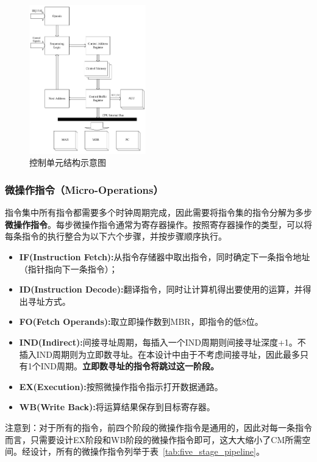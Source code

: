 \documentclass[lang=cn,a4paper,newtx]{elegantpaper}
\begin{document}
\begin{figure}[htbp]
  \centering
  \includegraphics[width = 0.45\textwidth]{figure/CU.pdf}
  \caption{控制单元结构示意图}
  \label{fig:controlunit}
\end{figure}

\subsubsection{微操作指令（Micro-Operations）}\label{sec:cu:micro}
指令集中所有指令都需要多个时钟周期完成，因此需要将指令集的指令分解为多步\textbf{微操作指令}。每步微操作指令通常为寄存器操作。按照寄存器操作的类型，可以将每条指令的执行整合为以下六个步骤，并按步骤顺序执行。
\begin{itemize}
  \item \textbf{IF(Instruction Fetch):}从指令存储器中取出指令，同时确定下一条指令地址（指针指向下一条指令）；
  \item \textbf{ID(Instruction Decode):}翻译指令，同时让计算机得出要使用的运算，并得出寻址方式。
  \item \textbf{FO(Fetch Operands):}取立即操作数到MBR，即指令的低8位。
  \item \textbf{IND(Indirect):}间接寻址周期，每插入一个IND周期则间接寻址深度+1。不插入IND周期则为立即数寻址。在本设计中由于不考虑间接寻址，因此最多只有1个IND周期。\textbf{立即数寻址的指令将跳过这一阶段。}
  \item \textbf{EX(Execution):}按照微操作指令指示打开数据通路。
  \item \textbf{WB(Write Back):}将运算结果保存到目标寄存器。
\end{itemize}

注意到：对于所有的指令，前四个阶段的微操作指令是通用的，因此对每一条指令而言，只需要设计EX阶段和WB阶段的微操作指令即可，这大大缩小了CM所需空间。经设计，所有的微操作指令列举于表~\ref{tab:five_stage_pipeline}。
\end{document}
